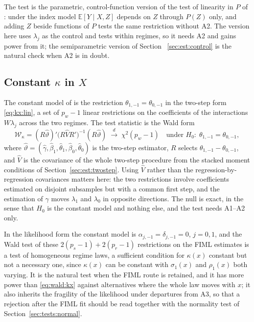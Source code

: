 \documentclass[11pt,a4paper]{article}
\theoremstyle{plain}
\theoremstyle{definition}
\theoremstyle{remark}
\newcommand{\E}{\mathbb{E}}
\newcommand{\1}{\mathbf{1}}
\newcommand{\kX}{\kappa(x)}
\begin{document}
The test is the parametric, control-function version of the test of
linearity in $P$ of \citet{heckman2005}: under the index model
$\E[Y\mid X,Z]$ depends on $Z$ through $P(Z)$ only, and adding $Z$ beside
functions of $P$ tests the same restriction without A2. The version here
uses $\lambda_j$ as the control and tests within regimes, so it needs A2 and
gains power from it; the semiparametric version of Section~%
\ref{sec:est:control} is the natural check when A2 is in doubt.

\subsection{Constant \texorpdfstring{$\kappa$}{kappa} in \texorpdfstring{$X$}{X}}\label{sec:tests:kx}

The constant model of \citet{araar2026sog} is the restriction
$\theta_{1,-1}=\theta_{0,-1}$ in the two-step form \eqref{eq:kx:lin}, a set
of $p_w-1$ linear restrictions on the coefficients of the interactions
$W\lambda_j$ across the two regimes. The test statistic is the Wald form
\begin{equation}\label{eq:wald:kx}
\mathcal{W}_\kappa=(R\hat\vartheta)'\bigl(R\hat V R'\bigr)^{-1}(R\hat\vartheta)
\;\xrightarrow{d}\;\chi^2(p_w-1)\quad\text{under }H_0:\;\theta_{1,-1}=\theta_{0,-1},
\end{equation}
where $\hat\vartheta=(\hat\gamma,\hat\beta_1,\hat\theta_1,\hat\beta_0,\hat\theta_0)$
is the two-step estimator, $R$ selects $\theta_{1,-1}-\theta_{0,-1}$, and
$\hat V$ is the covariance of the whole two-step procedure from the stacked
moment conditions of Section~\ref{sec:est:twostep}. Using $\hat V$ rather
than the regression-by-regression covariances matters here: the two
restrictions involve coefficients estimated on disjoint subsamples but with
a common first step, and the estimation of $\gamma$ moves $\lambda_1$ and
$\lambda_0$ in opposite directions. The null is exact, in the sense that
$H_0$ is the constant model and nothing else, and the test needs A1--A2
only.

In the likelihood form the constant model is $\alpha_{j,-1}=\delta_{j,-1}=0$,
$j=0,1$, and the Wald test of these $2(p_s-1)+2(p_r-1)$ restrictions on the
FIML estimates is a test of homogeneous regime laws, a sufficient condition
for $\kX$ constant but not a necessary one, since $\kX$ can be constant with
$\sigma_1(x)$ and $\rho_1(x)$ both varying. It is the natural test when the
FIML route is retained, and it has more power than \eqref{eq:wald:kx} against
alternatives where the whole law moves with $x$; it also inherits the
fragility of the likelihood under departures from A3, so that a rejection
after the FIML fit should be read together with the normality test of
Section~\ref{sec:tests:normal}.
\end{document}
